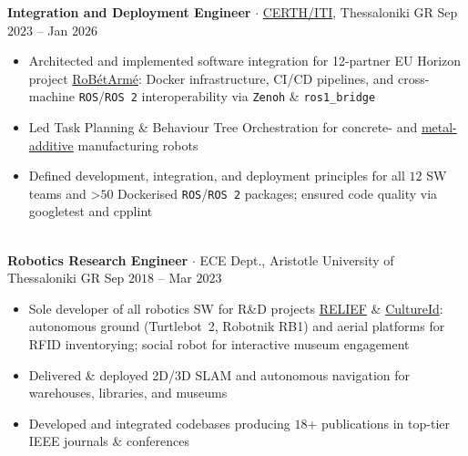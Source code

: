 \documentclass[a4paper,10pt,twoside]{article}
\begin{document}
  \noindent\textbf{Integration and Deployment Engineer} $\cdot$ \href{https://robotics.iti.gr/en/home/}{CERTH/ITI}, Thessaloniki GR \hfill {\small \textcolor{agray}{Sep $2023$ -- Jan $2026$}} \\
  \begin{minipage}[t]{\textwidth}
    \begin{itemize}
      \item Architected and implemented software integration for 12-partner EU Horizon project \href{https://www.robetarme-project.eu/sobre/}{RoBétArmé}: Docker infrastructure, CI/CD pipelines, and cross-machine \texttt{ROS}/\texttt{ROS~2} interoperability via \texttt{Zenoh} \& \texttt{ros1\_bridge}\verticalspaceafteritem
    \item Led Task Planning \& Behaviour Tree Orchestration for concrete- and \href{https://www.youtube.com/watch?v=xuIbOL-MPRk}{metal-additive} manufacturing robots\verticalspaceafteritem
      \item Defined development, integration, and deployment principles for all $12$ SW teams and >$50$ Dockerised \texttt{ROS}/\texttt{ROS~2} packages; ensured code quality via googletest and cpplint
    \end{itemize}
  \end{minipage} \\[-0.2em]

  \noindent\textbf{Robotics Research Engineer} $\cdot$ ECE Dept., Aristotle University of Thessaloniki GR \hfill {\small \textcolor{agray}{Sep $2018$ -- Mar $2023$}} \\
  \begin{minipage}[t]{\textwidth}
    \begin{itemize}
      \item Sole developer of all robotics SW for R\&D projects \href{https://relief.web.auth.gr/language/en/home/\#pg-72-1}{RELIEF} \& \href{https://cultureid.web.auth.gr/?page\_id=200&lang=en}{CultureId}: autonomous ground (Turtlebot~2, Robotnik RB1) and aerial platforms for RFID inventorying; social robot for interactive museum engagement\verticalspaceafteritem
      \item Delivered \& deployed 2D/3D SLAM and autonomous navigation for warehouses, libraries, and museums \verticalspaceafteritem
      \item Developed and integrated codebases producing $18$+ publications in top-tier IEEE journals \& conferences
    \end{itemize}
  \end{minipage} \\[-0.2em]
\end{document}
